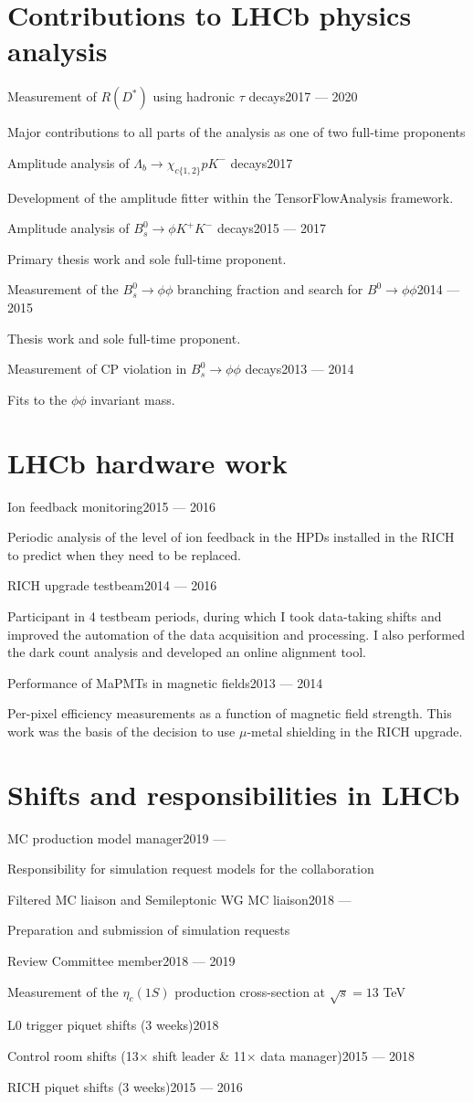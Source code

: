 \documentclass[contbibnum,titleabove]{simplecv}
\newcommand\dateditem[2]{\vspace{0.5em}#1\hfill#2\par}
\newcommand\topictitle[3]{\par\dateditem{#1}{#3}{\color{darkgray}#2}}
\begin{document}
	\section{Contributions to LHCb physics analysis}
	\topictitle{Measurement of $R(D^*)$ using hadronic $\tau$ decays}{Major contributions to all parts of the analysis as one of two full-time proponents}{2017 --- 2020}
	\topictitle{Amplitude analysis of $\Lambda_b \to \chi_{c\{1,2\}} p K^{-}$ decays}{Development of the amplitude fitter within the TensorFlowAnalysis framework.}{2017}
	\topictitle{Amplitude analysis of $B^0_s \to \phi K^{+}K^{-}$ decays}{Primary thesis work and sole full-time proponent.}{2015 --- 2017}
	\topictitle{Measurement of the $B^0_s \to \phi\phi$ branching fraction and search for $B^0 \to \phi \phi$}{Thesis work and sole full-time proponent.}{2014 --- 2015}
	\topictitle{Measurement of CP violation in $B^0_s \to \phi\phi$ decays}{Fits to the $\phi\phi$ invariant mass.}{2013 --- 2014}
	\section{LHCb hardware work}
	\topictitle{Ion feedback monitoring}{
	Periodic analysis of the level of ion feedback in the HPDs installed in the RICH to predict when they need to be replaced.
	}{2015 --- 2016}
	\topictitle{RICH upgrade testbeam}{
	Participant in 4 testbeam periods, during which I took data-taking shifts and improved the automation of the data acquisition and processing. I also performed the dark count analysis and developed an online alignment tool.
	}{2014 --- 2016}
	\topictitle{Performance of MaPMTs in magnetic fields}{
	Per-pixel efficiency measurements as a function of magnetic field strength. This work was the basis of the decision to use $\mu$-metal shielding in the RICH upgrade.
	}{2013 --- 2014}
	\section{Shifts and responsibilities in LHCb}
	\topictitle{MC production model manager}{Responsibility for simulation request models for the collaboration}{2019 --- \phantom{2020}}
	\topictitle{Filtered MC liaison and Semileptonic WG MC liaison}{Preparation and submission of simulation requests}{2018 --- \phantom{2020}}
	\topictitle{Review Committee member}{Measurement of the $\eta_c(1S)$ production cross-section at $\sqrt{s}=13$ TeV}{2018 --- 2019}
	\topictitle{L0 trigger piquet shifts (3 weeks)}{}{2018}
	\topictitle{Control room shifts (13$\times$ shift leader \& 11$\times$ data manager)}{}{2015 --- 2018}
	\topictitle{RICH piquet shifts (3 weeks)}{}{2015 --- 2016}
\end{document}

